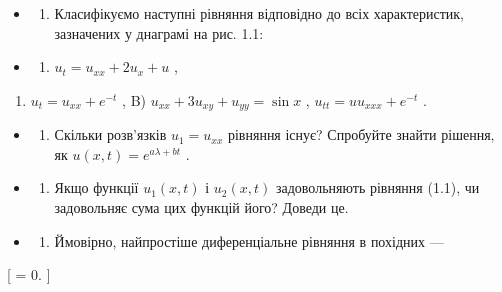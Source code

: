 \documentclass[
  ukrainian,
]{article}
\providecommand{\tightlist}{%
  \setlength{\itemsep}{0pt}\setlength{\parskip}{0pt}}
\begin{document}
\begin{itemize}
\tightlist
\item
  \begin{enumerate}
  \def\labelenumi{\arabic{enumi}.}
  \tightlist
  \item
    Класифікуємо наступні рівняння відповідно до всіх характеристик,
    зазначених у днаграмі на рис. 1.1:
  \end{enumerate}
\item
  \begin{enumerate}
  \def\labelenumi{\alph{enumi})}
  \tightlist
  \item
    \(u_t = u_{xx} + 2u_x + u\) ,
  \end{enumerate}
\end{itemize}

\begin{enumerate}
\def\labelenumi{\arabic{enumi})}
\setcounter{enumi}{5}
\tightlist
\item
  \(u_t = u_{xx} + e^{-t}\) , B) \(u_{xx} + 3u_{xy} + u_{yy} = \sin x\)
  , \(u_{tt} = uu_{xxx} + e^{-t}\) .
\end{enumerate}

\begin{itemize}
\tightlist
\item
  \begin{enumerate}
  \def\labelenumi{\arabic{enumi}.}
  \setcounter{enumi}{1}
  \tightlist
  \item
    Скільки розв'язків \(u_1 = u_{xx}\) рівняння існує? Спробуйте знайти
    рішення, як \(u(x, t) = e^{a\lambda + bt}\) .
  \end{enumerate}
\item
  \begin{enumerate}
  \def\labelenumi{\arabic{enumi}.}
  \setcounter{enumi}{2}
  \tightlist
  \item
    Якщо функції \(u_1(x, t)\) і \(u_2(x, t)\) задовольняють рівняння
    (1.1), чи задовольняє сума цих функцій його? Доведи це.
  \end{enumerate}
\item
  \begin{enumerate}
  \def\labelenumi{\arabic{enumi}.}
  \setcounter{enumi}{3}
  \tightlist
  \item
    Ймовірно, найпростіше диференціальне рівняння в похідних ---
  \end{enumerate}
\end{itemize}

{[}  = 0. {]}
\end{document}
